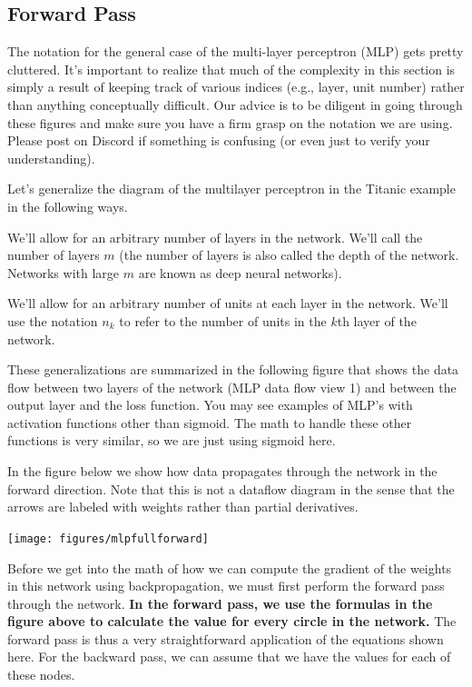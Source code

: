 \documentclass[assignment06_Solutions]{subfiles}
\begin{document}
\subsection{Forward Pass}
\begin{notice}
The notation for the general case of the multi-layer perceptron (MLP) gets pretty cluttered. It's important to realize that much of the complexity in this section is simply a result of keeping track of various indices (e.g., layer, unit number) rather than anything conceptually difficult.  Our advice is to be diligent in going through these figures and make sure you have a firm grasp on the notation we are using.  Please post on Discord if something is confusing (or even just to verify your understanding).
\end{notice}

Let's generalize the diagram of the multilayer perceptron in the Titanic example in the following ways.
\be
\item We'll allow for an arbitrary number of layers in the network.  We'll call the number of layers $m$ (the number of layers is also called the depth of the network.  Networks with large $m$ are known as deep neural networks).
\item We'll allow for an arbitrary number of units at each layer in the network.  We'll use the notation $n_k$ to refer to the number of units in the $k$th layer of the network.
\ee

These generalizations are summarized in the following figure that shows the data flow between two layers of the network (MLP data flow view 1) and between the output layer and the loss function.  You may see examples of MLP's with activation functions other than sigmoid.  The math to handle these other functions is very similar, so we are just using sigmoid here.

In the figure below we show how data propagates through the network in the forward direction.  Note that this is not a dataflow diagram in the sense that the arrows are labeled with weights rather than partial derivatives.

\texttt{[image: figures/mlpfullforward]}

Before we get into the math of how we can compute the gradient of the weights in this network using backpropagation, we must first perform the forward pass through the network.  \textbf{In the forward pass, we use the formulas in the figure above to calculate the value for every circle in the network.}  The forward pass is thus a very straightforward application of the equations shown here.  For the backward pass, we can assume that we have the values for each of these nodes.
\end{document}
